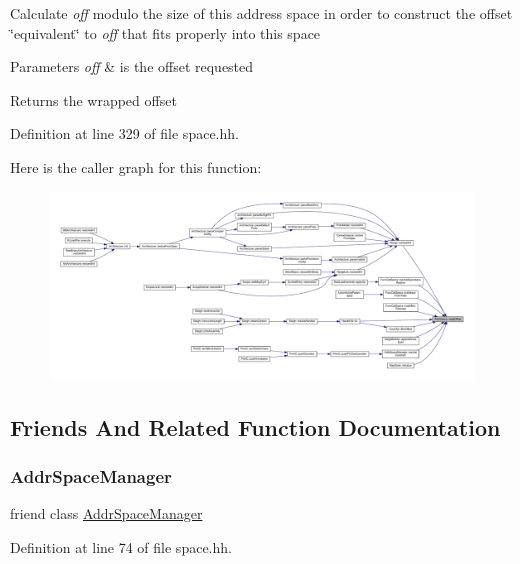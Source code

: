 Calculate {\itshape off} modulo the size of this address space in order to construct the offset \char`\"{}equivalent\char`\"{} to {\itshape off} that fits properly into this space 
\begin{DoxyParams}{Parameters}
{\em off} & is the offset requested \\
\hline
\end{DoxyParams}
\begin{DoxyReturn}{Returns}
the wrapped offset 
\end{DoxyReturn}


Definition at line 329 of file space.\+hh.

Here is the caller graph for this function\+:
\nopagebreak
\begin{figure}[H]
\begin{center}
\leavevmode
\includegraphics[width=350pt]{class_addr_space_aaf923ed847e9804b55ffa12a51202712_icgraph}
\end{center}
\end{figure}


\subsection{Friends And Related Function Documentation}
\mbox{\label{class_addr_space_a0e578f3e90e10ec045899c0e9cb65d46}} 
\subsubsection{\texorpdfstring{AddrSpaceManager}{AddrSpaceManager}}
{\footnotesize\ttfamily friend class \mbox{\hyperlink{class_addr_space_manager}{Addr\+Space\+Manager}}\hspace{0.3cm}{\ttfamily [friend]}}



Definition at line 74 of file space.\+hh.



